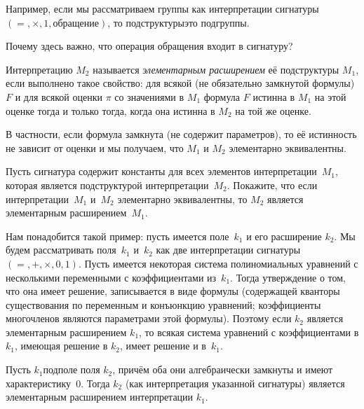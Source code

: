 Например, если мы рассматриваем группы как интерпретации
сигнатуры $({=},{\times},1, \text{обращение})$, то
подструктуры\т это подгруппы.

\begin{problem}
Почему здесь важно, что операция обращения входит в сигнатуру?
\end{problem}

        \label{elementary-extension}%
Интерпретацию $M_2$ называется \emph{элементарным расширением}%
%
её подструктуры $M_1$, если выполнено такое свойство: для всякой
(не обязательно замкнутой формулы) $F$ и для всякой оценки $\pi$
со значениями в $M_1$ формула $F$ истинна в $M_1$ на этой оценке
тогда и только тогда, когда она истинна в $M_2$ на той же
оценке.

В частности, если формула замкнута (не содержит параметров), то
её истинность не зависит от оценки и мы получаем, что $M_1$ и
$M_2$ элементарно эквивалентны.

\begin{problem}
Пусть сигнатура содержит константы для всех элементов
интерпретации~$M_1$, которая является подструктурой
интерпретации~$M_2$. Покажите, что если интерпретации~$M_1$
и~$M_2$ элементарно эквивалентны, то $M_2$ является элементарным
расширением~$M_1$.
\end{problem}

Нам понадобится такой пример: пусть имеется поле~$k_1$ и его
расширение $k_2$. Мы будем рассматривать поля~$k_1$ и~$k_2$ как
две интерпретации сигнатуры
$({=},{+},{\times},0,1)$. Пусть имеется
некоторая система полиномиальных уравнений с несколькими
переменными с коэффициентами из~$k_1$. Тогда утверждение о том,
что она имеет решение, записывается в виде формулы (содержащей
кванторы существования по переменным и конъюнкцию уравнений;
коэффициенты многочленов являются параметрами этой формулы).
Поэтому если $k_2$ является элементарным расширением $k_1$, то
всякая система уравнений с коэффициентами в $k_1$, имеющая
решение в $k_2$, имеет решение и в~$k_1$.

\begin{theorem}
        \label{model-completeness-algebraically-closed-fields}
Пусть $k_1$\т подполе поля $k_2$, причём оба они алгебраически
замкнуты и имеют характеристику~$0$. Тогда $k_2$
(как интерпретация указанной сигнатуры) является элементарным
расширением интерпретации $k_1$.
\end{theorem}

